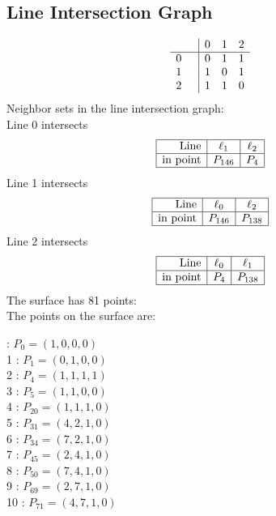 \documentclass{article}
\begin{document}
{\subsection*{Line Intersection Graph}
{\arraycolsep=1pt
$$
\begin{array}{rr|*{3}r}
 &  & 0 & 1 & 2\\
\hline
0 &  & 0 & 1 & 1\\
1 &  & 1 & 0 & 1\\
2 &  & 1 & 1 & 0\\
\end{array}
$$
}%
Neighbor sets in the line intersection graph:\\
Line 0 intersects 
$$
\begin{array}{|r*{2}{|c}|}
\hline
\mbox{Line}  & \ell_{1} & \ell_{2}\\
\hline
\mbox{in point}  & P_{146} & P_{4}\\
\hline
\end{array}
$$
Line 1 intersects 
$$
\begin{array}{|r*{2}{|c}|}
\hline
\mbox{Line}  & \ell_{0} & \ell_{2}\\
\hline
\mbox{in point}  & P_{146} & P_{138}\\
\hline
\end{array}
$$
Line 2 intersects 
$$
\begin{array}{|r*{2}{|c}|}
\hline
\mbox{Line}  & \ell_{0} & \ell_{1}\\
\hline
\mbox{in point}  & P_{4} & P_{138}\\
\hline
\end{array}
$$
The surface has 81 points:\\
The points on the surface are:\\
\begin{multicols}{3}
 : $P_{0}=( 1, 0, 0, 0 )$\\
1 : $P_{1}=( 0, 1, 0, 0 )$\\
2 : $P_{4}=( 1, 1, 1, 1 )$\\
3 : $P_{5}=( 1, 1, 0, 0 )$\\
4 : $P_{20}=( 1, 1, 1, 0 )$\\
5 : $P_{31}=( 4, 2, 1, 0 )$\\
6 : $P_{34}=( 7, 2, 1, 0 )$\\
7 : $P_{45}=( 2, 4, 1, 0 )$\\
8 : $P_{50}=( 7, 4, 1, 0 )$\\
9 : $P_{69}=( 2, 7, 1, 0 )$\\
10 : $P_{71}=( 4, 7, 1, 0 )$\\

\end{multicols}}
\end{document}
